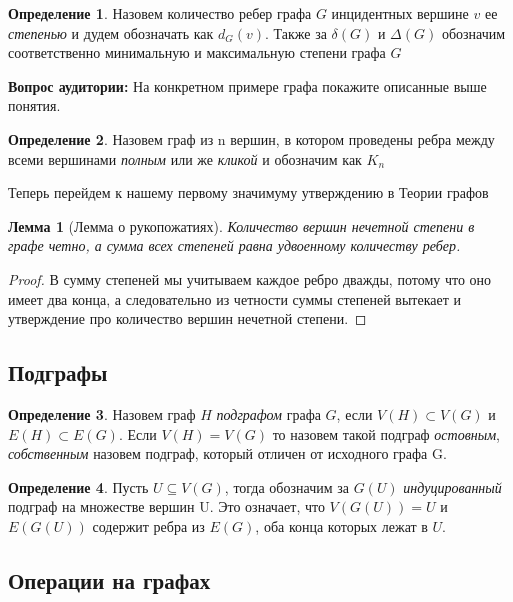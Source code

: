 \documentclass{article}
\newtheorem{lemma}{Лемма}
\theoremstyle{definition}
\newtheorem{definition}{Определение}[section]
\newcommand{\question}{\textbf{Вопрос аудитории: }}
\theoremstyle{remark}
\begin{document}
\begin{definition}
Назовем количество ребер графа $G$ инцидентных вершине $v$ ее \textit{степенью} и дудем обозначать как $d_{G}(v)$. Также за $\delta(G)$ и $\Delta(G)$ обозначим соответственно минимальную и максимальную степени графа $G$ 
\end{definition}

\question На конкретном примере графа покажите описанные выше понятия.

\begin{definition}
Назовем граф из n вершин, в котором проведены ребра между всеми вершинами \textit{полным} или же \textit{кликой} и обозначим как $K_n$
\end{definition}


Теперь перейдем к нашему первому значимуму утверждению в Теории графов


\begin{lemma}[Лемма о рукопожатиях]  
Количество вершин нечетной степени в графе четно, а сумма всех степеней равна удвоенному количеству ребер. \label{lemma1}
\end{lemma}
\begin{proof}
В сумму степеней мы учитываем каждое ребро дважды, потому что оно имеет два конца, а следовательно из четности суммы степеней вытекает и утверждение про количество вершин нечетной степени.
\end{proof}

\subsection{Подграфы}

\begin{definition}
    Назовем граф $H$ \textit{подграфом} графа $G$, если $V(H) \subset V(G)$ и  $E(H) \subset E(G)$. Если $V(H) = V(G)$ то назовем такой подграф \textit{остовным}, \textit{собственным} назовем подграф, который отличен от исходного графа G.
\end{definition}

\begin{definition}
    Пусть $U \subseteq V(G)$, тогда обозначим за $G(U)$ \textit{индуцированный} подграф на множестве вершин U. Это означает, что $V(G(U)) = U$ и $E(G(U))$ содержит ребра из $E(G)$, оба конца которых лежат в $U$.   
\end{definition}

\subsection{Операции на графах}
\end{document}
